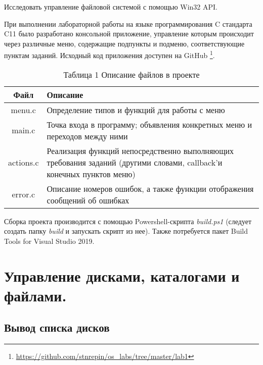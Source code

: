 \documentclass[a4paper,14pt]{extarticle}
\newcommand{\Code}[1]{\textit{#1}}
\begin{document}


\renewcommand*{\thepage}{}
\tableofcontents
\clearpage
\renewcommand*{\thepage}{\arabic{page}}

\setcounter{page}{3}


Исследовать управление файловой системой с помощью Win32 API.


При выполнении лабораторной работы на языке программирования C стандарта C11
было разработано консольной приложение, управление которым происходит через
различные меню, содержащие подпункты и подменю, соответствующие пунктам
заданий. Исходный код приложения доступен на GitHub
\footnote{\url{https://github.com/stnrepin/os_labs/tree/master/lab1}}.

\begin{table}[H]
    \centering
    \begin{tabularx}{\textwidth}{|c|X|}
        \hline
        Файл & Описание \\
        \hline
        menu.c & Определение типов и функций для работы с меню \\
        \hline
        main.c & Точка входа в программу; объявления конкретных меню и
                    переходов между ними \\
        \hline
        actions.c & Реализация функций непосредственно выполняющих требования
                    заданий (другими словами, callback'и конечных пунктов меню)
                    \\
        \hline
        error.c & Описание номеров ошибок, а также функции отображения
                    сообщений об ошибках \\
        \hline
    \end{tabularx}
    \caption*{Таблица 1 Описание файлов в проекте}
\end{table}

Сборка проекта производится с помощью Powershell-скрипта \Code{build.ps1}
(следует создать папку \Code{build} и запускать скрипт из нее). Также
потребуется пакет Build Tools for Visual Studio 2019.


\clearpage

\section{Управление дисками, каталогами и файлами.}


\subsection{Вывод списка дисков}
\end{document}
